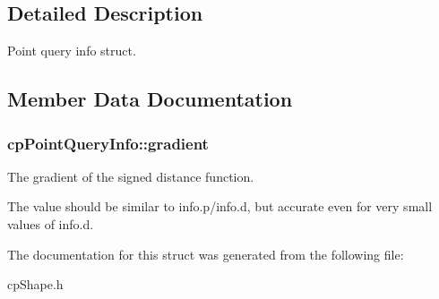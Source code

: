 \subsection{Detailed Description}
Point query info struct. 

\subsection{Member Data Documentation}
\hypertarget{structcp_point_query_info_a55bf2732bc2563af6c83ce1985906034}{}
\subsubsection[{gradient}]{ cp\+Point\+Query\+Info\+::gradient}\label{structcp_point_query_info_a55bf2732bc2563af6c83ce1985906034}


The gradient of the signed distance function. 

The value should be similar to info.\+p/info.d, but accurate even for very small values of info.\+d. 

The documentation for this struct was generated from the following file\+:\begin{DoxyCompactItemize}
\item 
cp\+Shape.\+h\end{DoxyCompactItemize}
